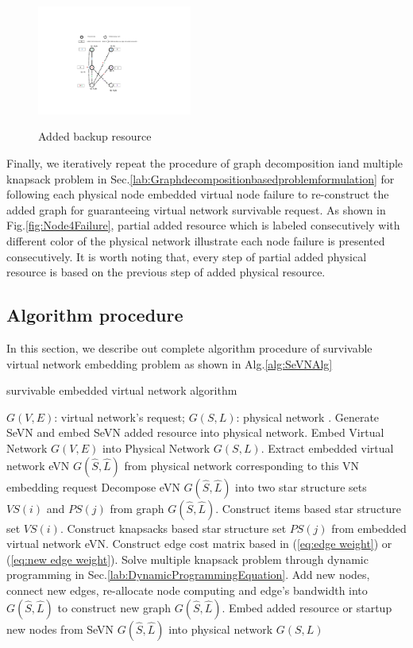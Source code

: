 \begin{figure}
  \centering
  \includegraphics[width=2in]{Fig/AugmentResource}\\
  \caption{Added backup resource}\label{fig:AugmentResource}
\end{figure}

Finally, we iteratively repeat the procedure of graph decomposition iand multiple knapsack problem in Sec.\ref{lab:Graphdecompositionbasedproblemformulation} for following each physical node embedded virtual node failure to re-construct the added graph for guaranteeing virtual network survivable request. As shown in Fig.\ref{fig:Node4Failure}, partial added resource which is labeled consecutively with different color of the physical network illustrate each node failure is presented consecutively. It is worth noting that, every step of partial added physical resource is based on the previous step of added physical resource.

\subsection{Algorithm procedure}
In this section, we describe out complete algorithm procedure of survivable virtual network embedding problem as shown in Alg.\ref{alg:SeVNAlg}
\begin{algorithm}[htbp]
\label{alg:SeVNAlg}
\caption{survivable embedded virtual network algorithm}
\begin{algorithmic}[1]
\REQUIRE $G (V,E)$: virtual network's request; $G (S,L)$: physical network .
\ENSURE Generate SeVN and embed SeVN added resource into physical network.
\STATE Embed Virtual Network $G(V,E)$ into Physical Network $G(S,L)$\cite{liu2011completing}.
\STATE Extract embedded virtual network eVN $G\left( {\hat S,\hat L} \right)$ from physical network corresponding to this VN embedding request
\STATE Decompose eVN $G\left( {\hat S,\hat L} \right)$ into two star structure sets $VS(i)$ and $PS(j)$ from graph $G\left( {\hat S,\hat L} \right)$.
\STATE Construct items based star structure set $VS(i)$.
\STATE Construct knapsacks based star structure set $PS(j)$ from embedded virtual network eVN.
\STATE Construct edge cost matrix based in (\ref{eq:edge weight}) or (\ref{eq:new edge weight}).
\STATE Solve multiple knapsack problem through dynamic programming in Sec.\ref{lab:DynamicProgrammingEquation}.
\STATE Add new nodes, connect new edges, re-allocate node computing and edge's bandwidth into $G\left( {\hat S,\hat L} \right)$ to construct new graph $G\left( {\hat S,\hat L} \right)$.
\ENDFOR
\STATE Embed added resource or startup new nodes from SeVN $G\left( {\hat S,\hat L} \right)$ into physical network $G(S,L)$
\end{algorithmic}
\end{algorithm}

